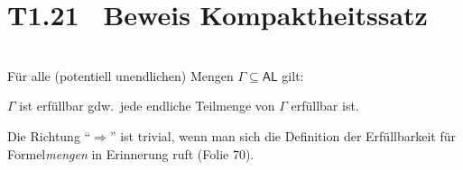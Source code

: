 \documentclass[fontsize=11pt, twoside=false, numbers=autoenddot]{scrbook}
\begin{document}
\section*{T1.21~ Beweis Kompaktheitssatz}

 \\
Für alle (potentiell unendlichen) Mengen $\Gamma \subseteq \textsf{AL}$ gilt:
\begin{center}
  $\Gamma$  ist erfüllbar gdw.\ jede endliche Teilmenge von $\Gamma$ erfüllbar ist.
\end{center}

\par\noindent
\begin{beweis}
  Die Richtung "`$\Rightarrow$"' ist trivial,
  wenn man sich die Definition der Erfüllbarkeit für Formel\emph{mengen} in Erinnerung ruft (Folie 70).


\end{beweis}
\end{document}
